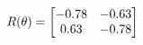 \documentclass[preview]{standalone}
\begin{document}
\begin{align*}
\special{dvisvgm:raw <g id='unique000'>}R(\theta) = \begin{bmatrix}-0.78 & -0.63\\0.63 & -0.78\end{bmatrix}\special{dvisvgm:raw </g>}
\end{align*}
\end{document}
